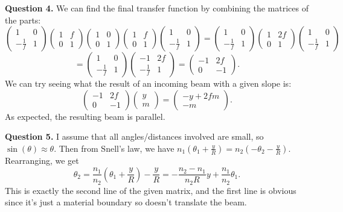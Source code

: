 \documentclass[letterpaper, reqno,11pt]{article}
\begin{document}
{\medskip\noindent\bf Question 4.} We can find the final transfer function by combining the matrices of the parts:
\[
    \begin{pmatrix} 1&0\\-\frac{1}{f}&1 \end{pmatrix} \begin{pmatrix} 1&f\\0&1 \end{pmatrix}\begin{pmatrix} 1&0\\0&1 \end{pmatrix} \begin{pmatrix} 1&f\\0&1 \end{pmatrix}\begin{pmatrix} 1&0\\-\frac{1}{f}&1 \end{pmatrix}=\begin{pmatrix} 1&0\\-\frac{1}{f}&1 \end{pmatrix} \begin{pmatrix}1&2f\\0&1\end{pmatrix}\begin{pmatrix} 1&0\\-\frac{1}{f}&1 \end{pmatrix} 
\]
\[
    =\begin{pmatrix} 1&0\\-\frac{1}{f}&1 \end{pmatrix}\begin{pmatrix} -1&2f\\-\frac{1}{f}&1 \end{pmatrix}=\begin{pmatrix} -1&2f\\0&-1 \end{pmatrix} 
.\]
We can try seeing what the result of an incoming beam with a given slope is:
\[
    \begin{pmatrix} -1&2f\\0&-1 \end{pmatrix}\begin{pmatrix} y\\m \end{pmatrix} =\begin{pmatrix} -y+2fm\\ -m \end{pmatrix} 
.\]
As expected, the resulting beam is parallel.

{\medskip\noindent\bf Question 5.} I assume that all angles/distances involved are small, so $\sin(\theta)\approx\theta$. Then from Snell's law, we have $n_1\left( \theta_1+ \frac{y}{R} \right) =n_2\left( -\theta_2 - \frac{y}{R} \right) $. Rearranging, we get
\[
\theta_2= \frac{n_1}{n_2}\left( \theta_1+ \frac{y}{R} \right) -\frac{y}{R}= -\frac{n_2-n_1}{n_2R}y+ \frac{n_1}{n_2}\theta_1 
.\]
This is exactly the second line of the given matrix, and the first line is obvious since it's just a material boundary so doesn't translate the beam.
\end{document}
